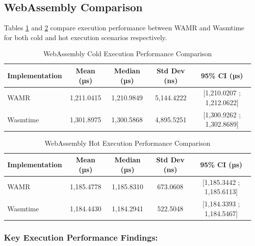 \subsection{WebAssembly Comparison}
\label{subsec:eval-execution-wasm}

Tables \ref{tab:wasm-execution-cold} and \ref{tab:wasm-execution-hot} compare execution performance between WAMR and Wasmtime for both cold and hot execution scenarios respectively.

\begin{table}[h]
    \centering
    \caption{WebAssembly Cold Execution Performance Comparison}
    \label{tab:wasm-execution-cold}
    \begin{tabular}{lcccc}
        \toprule
        \textbf{Implementation} & \textbf{Mean (µs)} & \textbf{Median (µs)} & \textbf{Std Dev (ns)} & \textbf{95\% CI (µs)} \\
        \midrule
        WAMR      & 1,211.0415 & 1,210.9849 & 5,144.4222 & [1,210.0207 ; 1,212.0622] \\
        Wasmtime  & 1,301.8975 & 1,300.5868 & 4,895.5251 & [1,300.9262 ; 1,302.8689] \\
        \bottomrule
    \end{tabular}
\end{table}

\begin{table}[h]
    \centering
    \caption{WebAssembly Hot Execution Performance Comparison}
    \label{tab:wasm-execution-hot}
    \begin{tabular}{lcccc}
        \toprule
        \textbf{Implementation} & \textbf{Mean (µs)} & \textbf{Median (µs)} & \textbf{Std Dev (ns)} & \textbf{95\% CI (µs)} \\
        \midrule
        WAMR      & 1,185.4778 & 1,185.8310 & 673.0608 & [1,185.3442 ; 1,185.6113] \\
        Wasmtime  & 1,184.4430 & 1,184.2941 & 522.5048 & [1,184.3393 ; 1,184.5467] \\
        \bottomrule
    \end{tabular}
\end{table}

\subsubsection{Key Execution Performance Findings:}

